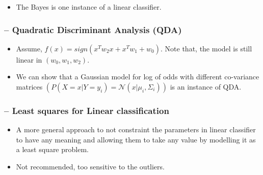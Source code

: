 \documentclass{article}
\begin{document}
\begin{itemize}
    \item The Bayes is one instance of a linear classifier.
\end{itemize}

\subsubsection{-- Quadratic Discriminant Analysis (QDA)}

\begin{itemize}
    \item Assume, $f(x) = sign(x^Tw_2x + x^Tw_1 + w_0)$. Note that, the model is still linear in $(w_0, w_1, w_2)$.
    \item We can show that a Gaussian model for log of odds with different co-variance matrices $(P(X=x|Y=y_i) = \mathcal{N}(x|\mu_i,\Sigma_i))$ is an instance of QDA.
\end{itemize}

\subsubsection{-- Least squares for Linear classification}

\begin{itemize}
    \item A more general approach to not constraint the parameters in linear classifier to have any meaning and allowing them to take any value by modelling it as a least square problem.
    \item Not recommended, too sensitive to the outliers.
    
\end{itemize}
\end{document}
